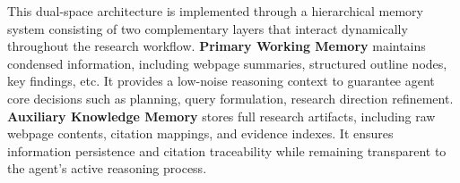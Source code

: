 \documentclass{huawei}
\begin{document}
This dual-space architecture is implemented through a hierarchical memory system consisting of two complementary layers that interact dynamically throughout the research workflow.%
\textbf{Primary Working Memory} maintains condensed information, including webpage summaries, structured outline nodes, key findings, etc. It provides a low-noise reasoning context to guarantee agent core decisions such as planning, query formulation, research direction refinement.
\textbf{Auxiliary Knowledge Memory} stores full research artifacts, including raw webpage contents, citation mappings, and evidence indexes. It ensures information persistence and citation traceability while remaining transparent to the agent's active reasoning process.





\end{document}
